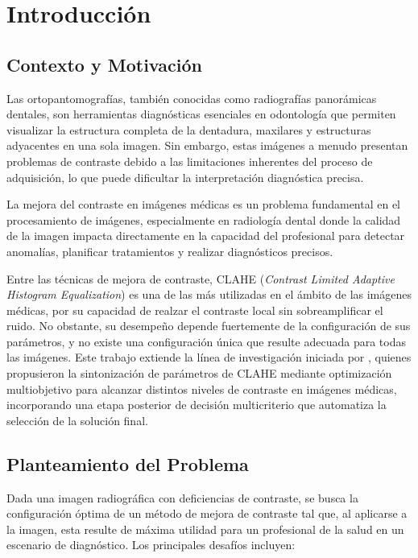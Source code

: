 \chapter{Introducción} %
\label{Chapter1} %

\section{Contexto y Motivación}

Las ortopantomografías, también conocidas como radiografías panorámicas dentales, son herramientas diagnósticas esenciales en odontología que permiten visualizar la estructura completa de la dentadura, maxilares y estructuras adyacentes en una sola imagen. Sin embargo, estas imágenes a menudo presentan problemas de contraste debido a las limitaciones inherentes del proceso de adquisición, lo que puede dificultar la interpretación diagnóstica precisa.

La mejora del contraste en imágenes médicas es un problema fundamental en el procesamiento de imágenes, especialmente en radiología dental donde la calidad de la imagen impacta directamente en la capacidad del profesional para detectar anomalías, planificar tratamientos y realizar diagnósticos precisos.

Entre las técnicas de mejora de contraste, CLAHE (\textit{Contrast Limited Adaptive Histogram Equalization}) \citep{Zuiderveld1994} es una de las más utilizadas en el ámbito de las imágenes médicas, por su capacidad de realzar el contraste local sin sobreamplificar el ruido. No obstante, su desempeño depende fuertemente de la configuración de sus parámetros, y no existe una configuración única que resulte adecuada para todas las imágenes. Este trabajo extiende la línea de investigación iniciada por \citet{More2015}, quienes propusieron la sintonización de parámetros de CLAHE mediante optimización multiobjetivo para alcanzar distintos niveles de contraste en imágenes médicas, incorporando una etapa posterior de decisión multicriterio que automatiza la selección de la solución final.

\section{Planteamiento del Problema}

Dada una imagen radiográfica con deficiencias de contraste, se busca la configuración óptima de un método de mejora de contraste tal que, al aplicarse a la imagen, esta resulte de máxima utilidad para un profesional de la salud en un escenario de diagnóstico. Los principales desafíos incluyen:

